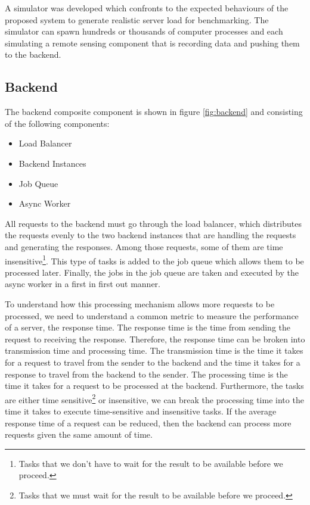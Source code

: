 \documentclass[../thesis.tex]{subfiles}
\begin{document}
A simulator was developed which confronts to the expected behaviours of the proposed system to generate realistic server load for benchmarking. The simulator can spawn hundreds or thousands of computer processes and each simulating a remote sensing component that is recording data and pushing them to the backend.


\subsection{Backend}
\label{sec:backend}

The backend composite component is shown in figure \ref{fig:backend} and consisting of the following components:
\begin{itemize}
\item Load Balancer
\item Backend Instances
\item Job Queue
\item Async Worker
\end{itemize}


All requests to the backend must go through the load balancer, which distributes the requests evenly to the two backend instances that are handling the requests and generating the responses. Among those requests, some of them are time insensitive\footnote{Tasks that we don't have to wait for the result to be available before we proceed.}. This type of tasks is added to the job queue which allows them to be processed later. Finally, the jobs in the job queue are taken and executed by the async worker in a first in first out manner.

To understand how this processing mechanism allows more requests to be processed, we need to understand a common metric to measure the performance of a server, the response time. The response time is the time from sending the request to receiving the response. Therefore, the response time can be broken into transmission time and processing time. The transmission time is the time it takes for a request to travel from the sender to the backend and the time it takes for a response to travel from the backend to the sender. The processing time is the time it takes for a request to be processed at the backend. Furthermore, the tasks are either time sensitive\footnote{Tasks that we must wait for the result to be available before we proceed.} or insensitive, we can break the processing time into the time it takes to execute time-sensitive and insensitive tasks. If the average response time of a request can be reduced, then the backend can process more requests given the same amount of time.
\end{document}
